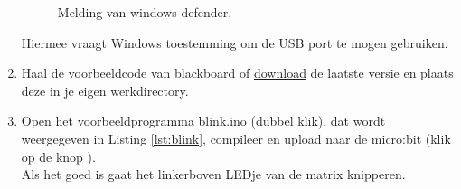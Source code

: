 \begin{enumerate}
\begin{figure}[h!]
   	\centering
   	\caption{Melding van windows defender.}
   	\label{fig:windowsDef}
   \end{figure}
Hiermee vraagt Windows toestemming om de USB port te mogen gebruiken.
\item Haal de voorbeeldcode van blackboard of \href{http://home.caiway.nl/~johnvi/embeddedFirstSem/voorbeeldCodeEmbedded.zip}{download} de laatste versie en plaats deze in je eigen werkdirectory.
\item \label{en:blink} Open het voorbeeldprogramma blink.ino (dubbel klik), dat wordt weergegeven in Listing \ref{lst:blink}, compileer en upload naar de micro:bit (klik op de knop ). \\
Als het goed is gaat het linkerboven LEDje van de matrix knipperen.

\end{enumerate}



